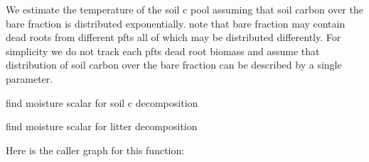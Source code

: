 We estimate the temperature of the soil c pool assuming that soil carbon over the bare fraction is distributed exponentially. note that bare fraction may contain dead roots from different pfts all of which may be distributed differently. For simplicity we do not track each pft\textquotesingle{}s dead root biomass and assume that distribution of soil carbon over the bare fraction can be described by a single parameter.

find moisture scalar for soil c decomposition

find moisture scalar for litter decomposition 

Here is the caller graph for this function\+:


